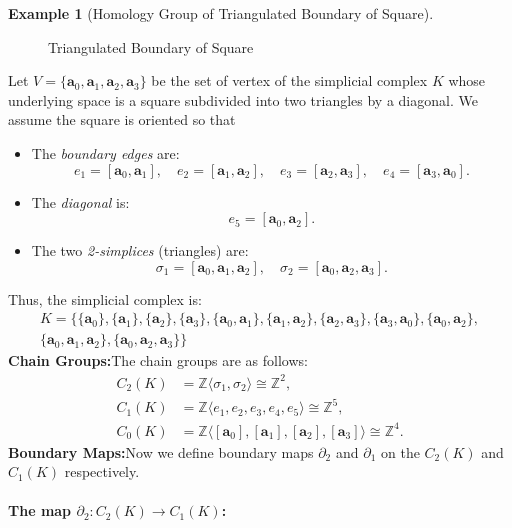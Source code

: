 \documentclass[12pt,oneside,reqno]{amsart}
\theoremstyle{plain}
\theoremstyle{definition}
\newtheorem{example}{Example}[section]
\theoremstyle{remark}
\newcommand{\0}{{\textbf{0}}}
\begin{document}
\begin{example}[Homology Group of Triangulated Boundary of Square]
\begin{figure}[h!]
\caption{Triangulated Boundary of Square}
\label{fig:Triangulated Boundary of Square}
\end{figure}
Let $V = \{\bm{a}_0, \bm{a}_1,\bm{a}_2, \bm{a}_3\}$ be the set of vertex of the simplicial complex $K$ whose underlying space is a square subdivided into two triangles by a diagonal. We assume the square is oriented so that
\begin{itemize}
    \item The \emph{boundary edges} are:
    \[
    e_1 = [\bm{a}_0, \bm{a}_1],\quad e_2 = [\bm{a}_1, \bm{a}_2],\quad e_3 = [\bm{a}_2, \bm{a}_3],\quad e_4 = [\bm{a}_3, \bm{a}_0].
    \]
    \item The \emph{diagonal} is:
    \[
    e_5 = [\bm{a}_0, \bm{a}_2].
    \]
    \item The two \emph{2-simplices} (triangles) are:
    \[
    \sigma_1 = [\bm{a}_0, \bm{a}_1, \bm{a}_2], \quad
    \sigma_2 = [\bm{a}_0, \bm{a}_2, \bm{a}_3].
    \]
\end{itemize}
Thus, the simplicial complex is:
\begin{multline*}
K = \{
\{\bm{a}_0\}, \{\bm{a}_1\}, \{\bm{a}_2\}, \{\bm{a}_3\}, \{\bm{a}_0, \bm{a}_1\}, \{\bm{a}_1,\bm{a}_2\},  \{\bm{a}_2,\bm{a}_3\}, \{\bm{a}_3,\bm{a}_0\}, \{\bm{a}_0,\bm{a}_2\},\\
\{\bm{a}_0, \bm{a}_1, \bm{a}_2\}, \{\bm{a}_0, \bm{a}_2, \bm{a}_3\}
\}   
\end{multline*}
\textbf{Chain Groups:}The chain groups are as follows:
\[
\begin{aligned}
C_2(K) &= \mathbb{Z}\langle \sigma_1, \sigma_2 \rangle \cong \mathbb{Z}^2, \\
C_1(K) &= \mathbb{Z}\langle e_1, e_2, e_3, e_4, e_5 \rangle \cong \mathbb{Z}^5, \\
C_0(K) &= \mathbb{Z}\langle [\bm{a}_0], [\bm{a}_1], [\bm{a}_2], [\bm{a}_3] \rangle \cong \mathbb{Z}^4.
\end{aligned}
\]
\textbf{Boundary Maps:}Now we define boundary maps $\partial_2$ and $\partial_1$ on the $C_{2}(K)$ and $C_{1}(K)$ respectively. 

\paragraph{The map \(\partial_2 \colon C_2(K) \to C_1(K)\):} 


\end{example}
\end{document}
